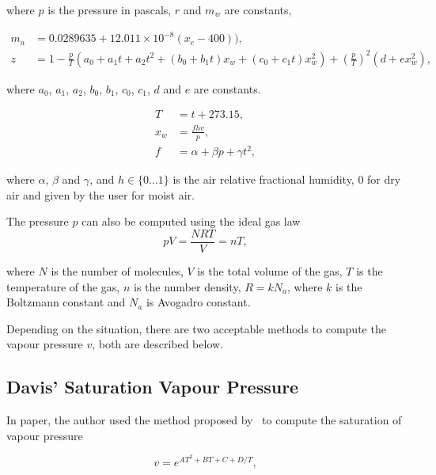 where $p$ is the pressure in pascals, $r$ and $m_w$ are constants, 

\begin{align}
\label{eq:ciddor_m_a}
m_a &= 0.0289635 + 12.011 \times 10^{-8}(x_c - 400)),\\
\label{eq:ciddor_z}
z &= 1 - \frac{p}{T} \left(a_0 + a_1 t + a_2 t^2 + \left(b_0 + b_1 t \right) x_w + \left(c_0 + c_1 t \right) x_w^2 \right) + \left( \frac{p}{T} \right)^2 \left( d + ex_w^2 \right),
\end{align}

where $a_0$,  $a_1$, $a_2$,  $b_0$,  $b_1$,  $c_0$,  $c_1$,  $d$ and $e$ are constants.

\begin{align}
\label{eq:ciddor_t}
T &= t + 273.15, \\
\label{eq:ciddor_x_w}
x_w &= \frac{f h v}{ p}, \\
\label{eq:ciddor_f}
f &= \alpha + \beta p + \gamma t^2,
\end{align}

where $\alpha$, $\beta$ and $\gamma$, and $h \in \lbrace 0 \ldots 1 \rbrace$ is the air relative fractional humidity, $0$ for dry air and given by the user for moist air.

The pressure $p$ can also be computed using the ideal gas law
\begin{equation}
\label{eq:ciddor_p}
pV=\frac{NRT}{V} = n T,
\end{equation}

where $N$ is the number of molecules, $V$ is the total volume of the gas, $T$ is the temperature of the gas, $n$ is the number density, $R = k N_a$, where $k$ is the Boltzmann constant and $N_a$ is Avogadro constant.

Depending on the situation, there are two acceptable methods to compute the vapour pressure $v$, both are described below.

\subsection{Davis' Saturation Vapour Pressure}
\label{subsec:davis_v}

In \cite{Ciddor:1996} paper, the author used the method proposed by~\cite{Davis:1992} to compute the saturation of vapour pressure

\begin{equation}
\label{eq:davis_v}
v = e^{AT^2 + BT + C + D/T},
\end{equation}

